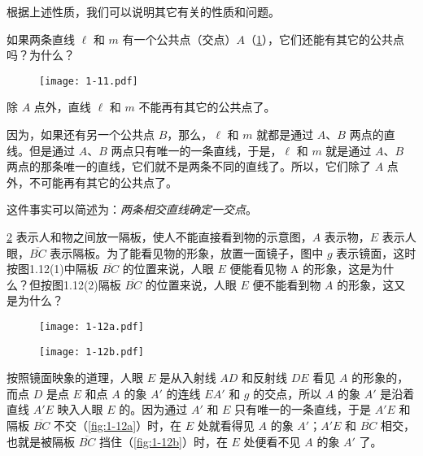 根据上述性质，我们可以说明其它有关的性质和问题。

\begin{example}
	如果两条直线 $\ell$ 和 $m$ 有一个公共点（交点）$A$（\cref{fig:1-11}），它们还能有其它的公共点吗？为什么？
\end{example}

\begin{figure}
	\texttt{[image: 1-11.pdf]}
	\caption{}\label{fig:1-11}
\end{figure}

\begin{solution}
除 $A$ 点外，直线 $\ell$ 和 $m$ 不能再有其它的公共点了。

因为，如果还有另一个公共点 $B$，那么，$\ell$ 和 $m$ 就都是通过 $A$、$B$ 两点的直线。但是通过 $A$、$B$ 两点只有唯一的一条直线，于是，$\ell$ 和 $m$ 就是通过 $A$、$B$ 两点的那条唯一的直线，它们就不是两条不同的直线了。所以，它们除了 $A$ 点外，不可能再有其它的公共点了。

这件事实可以简述为：\emph{两条相交直线确定一交点}。
\end{solution}


\begin{example}
	\cref{fig:1-12} 表示人和物之间放一隔板，使人不能直接看到物的示意图，$A$ 表示物，$E$ 表示人眼，$\overline{BC}$ 表示隔板。为了能看见物的形象，放置一面镜子，图中 $g$ 表示镜面，这时按图1.12(1)中隔板 $\overline{BC}$ 的位置来说，人眼 $E$ 便能看见物 A 的形象，这是为什么？但按图1.12(2)隔板 $\overline{BC}$ 的位置来说，人眼 $E$ 便不能看到物 $A$ 的形象，这又是为什么？
\end{example}

\begin{figure}
	\begin{minipage}[b]{0.45\linewidth}\centering
	  \texttt{[image: 1-12a.pdf]}
		\subcaption{}\label{fig:1-12a}
	\end{minipage}
	\begin{minipage}[b]{0.45\linewidth}\centering
	  \texttt{[image: 1-12b.pdf]}
		\subcaption{}\label{fig:1-12b}
	\end{minipage}
	\caption{}\label{fig:1-12}
\end{figure}

\begin{solution}
按照镜面映象的道理，人眼 $E$ 是从入射线 $AD$ 和反射线 $DE$ 看见 $A$ 的形象的，而点 $D$ 是点 $E$ 和点 $A$ 的象 $A'$ 的连线 $EA'$ 和 $g$ 的交点，所以 $A$ 的象 $A'$ 是沿着直线 $A'E$ 映入人眼 $E$ 的。因为通过 $A'$ 和 $E$ 只有唯一的一条直线，于是 $A'E$ 和隔板 $\overline{BC}$ 不交（\cref{fig:1-12a}）时，在 $E$ 处就看得见 $A$ 的象 $A'$；$A'E$ 和 $\overline{BC}$ 相交，也就是被隔板 $\overline{BC}$ 挡住（\cref{fig:1-12b}）时，在 $E$ 处便看不见 $A$ 的象 $A'$ 了。
\end{solution}

